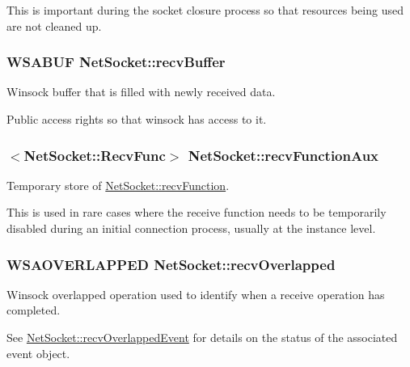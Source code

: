 This is important during the socket closure process so that resources being used are not cleaned up. \hypertarget{class_net_socket_a0565a5dafc4df4589c0013d0c2816f33}{
\subsubsection[{recvBuffer}]{\setlength{\rightskip}{0pt plus 5cm}WSABUF {\bf NetSocket::recvBuffer}}}
\label{class_net_socket_a0565a5dafc4df4589c0013d0c2816f33}


Winsock buffer that is filled with newly received data. 

Public access rights so that winsock has access to it. \hypertarget{class_net_socket_a7d4dd5d72c86d0ee4f46a3ec9e03bdfc}{
\subsubsection[{recvFunctionAux}]{$<${\bf NetSocket::RecvFunc}$>$ {\bf NetSocket::recvFunctionAux}}}
\label{class_net_socket_a7d4dd5d72c86d0ee4f46a3ec9e03bdfc}


Temporary store of \hyperlink{class_net_socket_a92fcd22d674b159c192f356728d2a575}{NetSocket::recvFunction}. 

This is used in rare cases where the receive function needs to be temporarily disabled during an initial connection process, usually at the instance level. \hypertarget{class_net_socket_ac260f690a6f192c22463d1f5ea903d96}{
\subsubsection[{recvOverlapped}]{\setlength{\rightskip}{0pt plus 5cm}WSAOVERLAPPED {\bf NetSocket::recvOverlapped}}}
\label{class_net_socket_ac260f690a6f192c22463d1f5ea903d96}


Winsock overlapped operation used to identify when a receive operation has completed. 

See \hyperlink{class_net_socket_aeeae305cd0382ee87cf9c35aec571719}{NetSocket::recvOverlappedEvent} for details on the status of the associated event object.\par
\par


